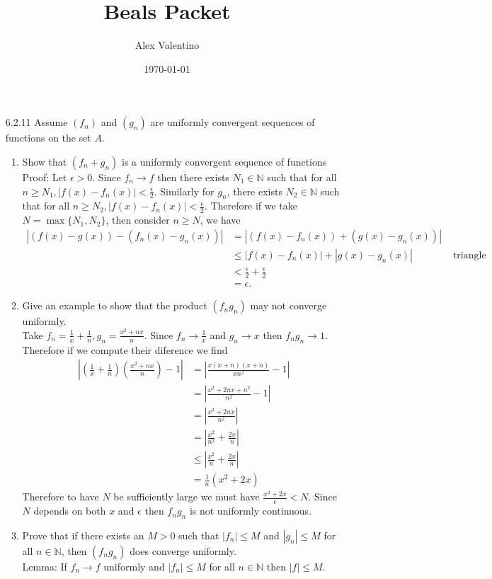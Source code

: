 \documentclass[12pt, letterpaper]{article}
\date{\today}
\author{Alex Valentino}
\title{Beals Packet}
\newcommand{\N}{\mathbb{N}}
\begin{document}
\begin{enumerate}
	\item[6.2.11] Assume $(f_n)$ and $(g_n)$ are uniformly convergent sequences of
functions on the set $A$.
	\begin{enumerate}
		\item Show that $(f_n+g_n)$ is a uniformly convergent sequence of functions\\
		Proof: Let $\epsilon > 0$.  Since $f_n \to f$ then there exists $N_1 \in \N$ such that for all $n \geq N_1,|f(x)-f_n(x)| < \frac{\epsilon}{2}$.  Similarly for $g_n$, there exists $N_2 \in \N$ such that for all $n \geq N_2,|f(x)-f_n(x)| < \frac{\epsilon}{2}$.  Therefore if we take $N = \max\{N_1, N_2\}$, then consider $n \geq N$, we have 
		\begin{align*}
			|(f(x) - g(x)) - (f_n(x) - g_n(x))| &= |(f(x) - f_n(x)) + (g(x) - g_n(x))|\\
			&\leq |f(x) - f_n(x)| + |g(x) - g_n(x)| & \text{ triangle inequality}\\
			&< \frac{\epsilon}{2} + \frac{\epsilon}{2}\\
			&= \epsilon.  
		\end{align*}
		\item Give an example to show that the product $(f_n g_n)$ may not converge uniformly.\\
		Take $f_n = \frac{1}{x} +\frac{1}{n}, g_n = \frac{x^2+nx}{n}$.  Since $f_n \to \frac{1}{x}$ and $g_n \to x$ 
		then $f_n g_n \to 1$.  Therefore if we compute their diference we find
		\begin{align*}
			|(\frac{1}{x} +\frac{1}{n})(\frac{x^2+nx}{n}) - 1| &= |\frac{x(x+n)(x+n)}{xn^2} - 1|\\
			&= |\frac{x^2+2nx + n^2}{n^2}-1|\\
			&= |\frac{x^2 + 2nx}{n^2}|\\
			&= |\frac{x^2}{n^2} + \frac{2x}{n}|\\
			&\leq |\frac{x^2}{n} + \frac{2x}{n}|\\
			&= \frac{1}{n}(x^2+2x)		
		\end{align*}
		Therefore to have $N$ be sufficiently large we must have $\frac{x^2+2x}{\epsilon} < N$.  Since $N$ depends on 
		both $x$ and $\epsilon$ then $f_n g_n$ is not uniformly continuous.    
		\item Prove that if there exists an $M > 0$ such that $|f_n| \leq M$ and $|g_n| \leq M$
for all $n \in \N$, then $(f_n g_n)$ does converge uniformly.  \\
		Lemma: If $f_n \to f$ uniformly and $|f_n| \leq M$ for all $n\in \N$ then $|f| \leq M$.

\end{enumerate}
\end{enumerate}
\end{document}

